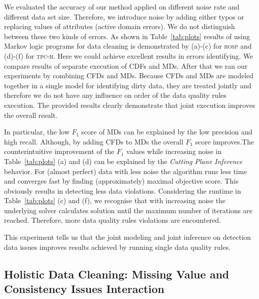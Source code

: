 We evaluated the accuracy of our method applied on different noise rate and different data set size. Therefore, we introduce noise by adding either typos or replacing values of attributes (active domain errors). We do not distinguish between these two kinds of errors. As shown in Table~\ref{tab:plots} results of using Markov logic programs for data cleaning is demonstrated by (a)-(c) for \textsc{hosp} and (d)-(f) for \textsc{tpc-h}.  Here we could achieve excellent results in errors identifying. We compare results of separate execution of CDFs and MDs. After that we ran our experiments by combining CFDs and MDs. Because CFDs and MDs are modeled together in a single model for identifying dirty data, they are treated jointly and therefore we do not have any influence on order of the data quality rules execution. The provided results clearly demonstrate that joint execution improves the overall result.  

In particular, the low $F_1$ score of MDs can be explained by the low precision and high recall. Although, by adding CFDs to MDs the overall $F_1$ score improves.The counterintuitive improvement of the $F_1$ values while increasing noise in Table~\ref{tab:plots} (a) and (d) can be explained by the \textit{Cutting Plane Inference} \cite{riedel08improving} behavior.  For (almost perfect) data with less noise the algorithm runs less time and converges fast by finding (approximately) maximal objective score. This obviously results in detecting less data violations. Considering the runtime in Table~\ref{tab:plots} (c) and (f), we recognise that with increasing noise the underlying solver calculates solution until the maximum number of iterations are reached. Therefore, more data quality rules violations are encountered.    

This experiment tells us that the joint modeling and joint inference on detection data issues improves results achieved by running single data quality rules. 

\subsection{Holistic Data Cleaning: Missing Value and Consistency Issues Interaction}

